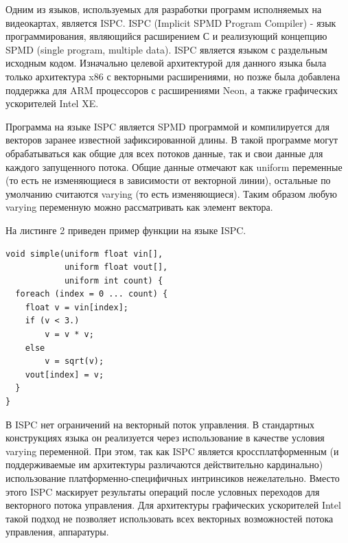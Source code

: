 Одним из языков, используемых для разработки программ исполняемых на видеокартах, является ISPC. ISPC (Implicit SPMD Program Compiler) - язык программирования, являющийся расширением С и реализующий концепцию SPMD (single program, multiple data). ISPC является языком с раздельным исходным кодом. Изначально целевой архитектурой для данного языка была только архитектура x86 с векторными расширениями, но позже была добавлена поддержка для ARM процессоров с расширениями Neon, а также графических ускорителей Intel XE.

Программа на языке ISPC является SPMD программой и компилируется для векторов заранее известной зафиксированной длины. В такой программе могут обрабатываться как общие для всех потоков данные, так и свои данные для каждого запущенного потока. Общие данные отмечают как uniform переменные (то есть не изменяющиеся в зависимости от векторной линии), остальные по умолчанию считаются varying (то есть изменяющиеся). Таким образом любую varying переменную можно рассматривать как элемент вектора.

На листинге 2 приведен пример функции на языке ISPC.

\begin{verbatim}
void simple(uniform float vin[],
            uniform float vout[],
            uniform int count) {
  foreach (index = 0 ... count) {
    float v = vin[index];
    if (v < 3.)
        v = v * v;
    else
        v = sqrt(v);
    vout[index] = v;
  }
}
\end{verbatim}

В ISPC нет ограничений на векторный поток управления. В стандартных конструкциях языка он реализуется через использование в качестве условия varying переменной. При этом, так как ISPC является кроссплатформенным (и поддерживаемые им архитектуры различаются действительно кардинально) использование платформенно-специфичных интринсиков нежелательно. Вместо этого ISPC маскирует результаты операций после условных переходов для векторного потока управления. Для архитектуры графических ускорителей Intel такой подход не позволяет использовать всех векторных возможностей потока управления, аппаратуры.

